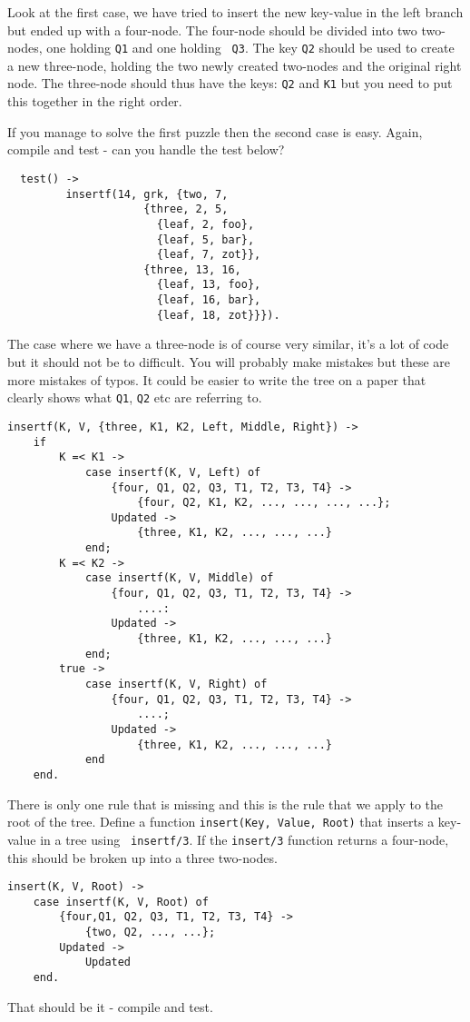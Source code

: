 \documentclass[a4paper,11pt]{article}
\begin{document}
Look at the first case, we have tried to insert the new key-value in
the left branch but ended up with a four-node. The four-node should be
divided into two two-nodes, one holding {\tt Q1} and one holding {\tt
  Q3}. The key {\tt Q2} should be used to create a new three-node,
holding the two newly created two-nodes and the original right
node. The three-node should thus have the keys: {\tt Q2} and {\tt K1} but
you need to put this together in the right order.

If you manage to solve the first puzzle then the second case is
easy. Again, compile and test - can you handle the test below?

\begin{lstlisting}
  test() ->
         insertf(14, grk, {two, 7,
                     {three, 2, 5,
                       {leaf, 2, foo},
                       {leaf, 5, bar},
                       {leaf, 7, zot}},
                     {three, 13, 16,
                       {leaf, 13, foo},
                       {leaf, 16, bar},
                       {leaf, 18, zot}}}).    
\end{lstlisting}

The case where we have a three-node is of course very similar, it's a
lot of code but it should not be to difficult. You will probably make
mistakes but these are more mistakes of typos. It could be easier to
write the tree on a paper that clearly shows what {\tt Q1}, {\tt Q2}
etc are referring to.

\begin{lstlisting}
insertf(K, V, {three, K1, K2, Left, Middle, Right}) ->
    if 
        K =< K1 ->
            case insertf(K, V, Left) of 
                {four, Q1, Q2, Q3, T1, T2, T3, T4} -> 
                    {four, Q2, K1, K2, ..., ..., ..., ...}; 
                Updated ->
                    {three, K1, K2, ..., ..., ...}
            end;
        K =< K2 ->
            case insertf(K, V, Middle) of
                {four, Q1, Q2, Q3, T1, T2, T3, T4} ->           
                    ....:
                Updated ->
                    {three, K1, K2, ..., ..., ...}
            end;
        true ->
            case insertf(K, V, Right) of
                {four, Q1, Q2, Q3, T1, T2, T3, T4} ->           
                    ....;
                Updated ->
                    {three, K1, K2, ..., ..., ...}
            end
    end.
\end{lstlisting}

There is only one rule that is missing and this is the rule that we
apply to the root of the tree. Define a function {\tt insert(Key,
  Value, Root)} that inserts a key-value in a tree using {\tt
  insertf/3}. If the {\tt insert/3} function returns a four-node, this
should be broken up into a three two-nodes.

\begin{lstlisting}
insert(K, V, Root) ->
    case insertf(K, V, Root) of
        {four,Q1, Q2, Q3, T1, T2, T3, T4} ->
            {two, Q2, ..., ...};
        Updated ->
            Updated
    end.
\end{lstlisting}

That should be it - compile and test.
\end{document}
